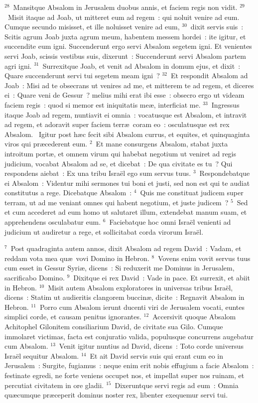 ${}^{28}$~Mansitque Absalom in Jerusalem duobus annis, et faciem regis non vidit.
${}^{29}$~Misit itaque ad Joab, ut mitteret eum ad regem~: qui noluit venire ad eum. Cumque secundo misisset, et ille noluisset venire ad eum,
${}^{30}$~dixit servis suis~: Scitis agrum Joab juxta agrum meum, habentem messem hordei~: ite igitur, et succendite eum igni. Succenderunt ergo servi Absalom segetem igni. Et venientes servi Joab, scissis vestibus suis, dixerunt~: Succenderunt servi Absalom partem agri igni.
${}^{31}$~Surrexitque Joab, et venit ad Absalom in domum ejus, et dixit~: Quare succenderunt servi tui segetem meam igni~?
${}^{32}$~Et respondit Absalom ad Joab~: Misi ad te obsecrans ut venires ad me, et mitterem te ad regem, et diceres ei~: Quare veni de Gessur~? melius mihi erat ibi esse~: obsecro ergo ut videam faciem regis~: quod si memor est iniquitatis me\ae , interficiat me.
${}^{33}$~Ingressus itaque Joab ad regem, nuntiavit ei omnia~: vocatusque est Absalom, et intravit ad regem, et adoravit super faciem terr\ae\ coram eo~: osculatusque est rex Absalom.
~Igitur post h\ae c fecit sibi Absalom currus, et equites, et quinquaginta viros qui pr\ae cederent eum.
${}^{2}$~Et mane consurgens Absalom, stabat juxta introitum port\ae , et omnem virum qui habebat negotium ut veniret ad regis judicium, vocabat Absalom ad se, et dicebat~: De qua civitate es tu~? Qui respondens aiebat~: Ex una tribu Isra\"el ego sum servus tuus.
${}^{3}$~Respondebatque ei Absalom~: Videntur mihi sermones tui boni et justi, sed non est qui te audiat constitutus a rege. Dicebatque Absalom~:
${}^{4}$~Quis me constituat judicem super terram, ut ad me veniant omnes qui habent negotium, et juste judicem~?
${}^{5}$~Sed et cum accederet ad eum homo ut salutaret illum, extendebat manum suam, et apprehendens osculabatur eum.
${}^{6}$~Faciebatque hoc omni Isra\"el venienti ad judicium ut audiretur a rege, et sollicitabat corda virorum Isra\"el.


${}^{7}$~Post quadraginta autem annos, dixit Absalom ad regem David~: Vadam, et reddam vota mea qu\ae\ vovi Domino in Hebron.
${}^{8}$~Vovens enim vovit servus tuus cum esset in Gessur Syri\ae , dicens~: Si reduxerit me Dominus in Jerusalem, sacrificabo Domino.
${}^{9}$~Dixitque ei rex David~: Vade in pace. Et surrexit, et abiit in Hebron.
${}^{10}$~Misit autem Absalom exploratores in universas tribus Isra\"el, dicens~: Statim ut audieritis clangorem buccin\ae , dicite~: Regnavit Absalom in Hebron.
${}^{11}$~Porro cum Absalom ierunt ducenti viri de Jerusalem vocati, euntes simplici corde, et causam penitus ignorantes.
${}^{12}$~Accersivit quoque Absalom Achitophel Gilonitem consiliarium David, de civitate sua Gilo. Cumque immolaret victimas, facta est conjuratio valida, populusque concurrens augebatur cum Absalom.
${}^{13}$~Venit igitur nuntius ad David, dicens~: Toto corde universus Isra\"el sequitur Absalom.
${}^{14}$~Et ait David servis suis qui erant cum eo in Jerusalem~: Surgite, fugiamus~: neque enim erit nobis effugium a facie Absalom~: festinate egredi, ne forte veniens occupet nos, et impellat super nos ruinam, et percutiat civitatem in ore gladii.
${}^{15}$~Dixeruntque servi regis ad eum~: Omnia qu\ae cumque pr\ae ceperit dominus noster rex, libenter exequemur servi tui.


